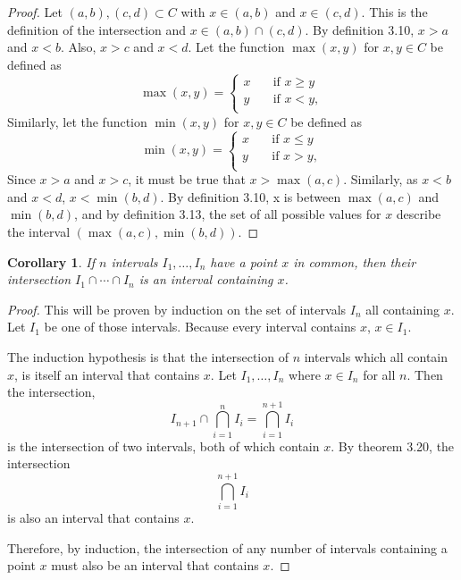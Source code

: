 \documentclass{amsart}
\newtheorem{corollary}[theorem]{Corollary}
\newcommand{\1}{\mathds{1}}
\numberwithin{equation}{section}
\numberwithin{theorem}{section}
\begin{document}
\begin{proof}
	Let $(a,b),(c,d)\subset C$ with $x\in (a,b)$ and $x\in (c,d)$. This is the definition of the intersection and $x\in (a,b)\cap (c,d)$. By definition 3.10, $x>a$ and $x<b$. Also, $x>c$ and $x<d$. Let the function $\max(x,y)$ for $x,y\in C$ be defined as
	\[\max(x,y) = \begin{cases}
		x \quad &\text{if } x\geq y\\
		y \quad &\text{if } x<y,\\
	\end{cases}\]
	Similarly, let the function $\min(x,y)$ for $x,y\in C$ be defined as 
	\[\min(x,y) = \begin{cases}
		x \quad &\text{if } x\leq y\\
		y \quad &\text{if } x>y,\\
	\end{cases}\]
	Since $x>a$ and $x>c$, it must be true that $x>\max(a,c)$. Similarly, as $x<b$ and $x<d$, $x<\min(b,d)$. By definition 3.10, x is between $\max(a,c)$ and $\min(b,d)$, and by definition 3.13, the set of all possible values for $x$ describe the interval $(\max(a,c),\min(b,d))$.
\end{proof}

\begin{corollary}\label{c.interval_intersection}
	If $n$ intervals $I_1, \dotsc, I_n$ have a point $x$ in common, then their intersection $I_1 \cap \dotsm \cap I_n$ is an interval containing $x$.
\end{corollary}
	
\begin{proof}
	This will be proven by induction on the set of intervals $I_n$ all containing $x$. Let $I_1$ be one of those intervals. Because every interval contains $x$, $x\in I_1$. 
	
	The induction hypothesis is that the intersection of $n$ intervals which all contain $x$, is itself an interval that contains $x$. Let $I_1, \dotsc, I_n$  where $x\in I_n$ for all $n$. Then the intersection, 
	$$I_{n+1} \cap \bigcap_{i=1}^n I_i = \bigcap_{i=1}^{n+1} I_i$$ is the intersection of two intervals, both of which contain $x$. By theorem 3.20, the intersection $$\bigcap_{i=1}^{n+1} I_i$$ is also an interval that contains $x$. 
	
	Therefore, by induction, the intersection of any number of intervals containing a point $x$ must also be an interval that contains $x$.
\end{proof}
\end{document}
